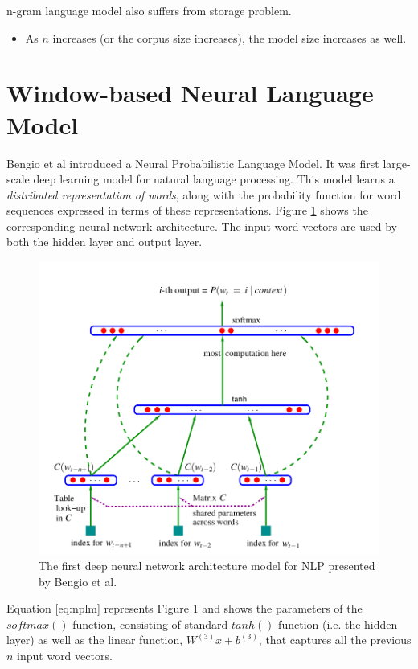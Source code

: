 \documentclass[letterpaper]{article}
\begin{document}
n-gram language model also suffers from storage problem.
\begin{itemize}
	\item As $n$ increases (or the corpus size increases), the model size increases
	as well.
\end{itemize}

\section{Window-based Neural Language Model}
Bengio et al introduced a Neural Probabilistic Language Model. It was
first large-scale deep learning model for natural language processing.
This model learns a \textit{distributed representation of words}, along
with the probability function for word sequences expressed in terms of
these representations. Figure \ref{fig:nplm} shows the corresponding
neural network architecture. The input word vectors are used by both
the hidden layer and output layer.


\begin{figure}[ht]
	\includegraphics[scale=0.3]{images/Neural_Language_Model.png}
	\caption{The first deep neural network architecture model
	for NLP presented by Bengio et al.}
	\label{fig:nplm}
\end{figure}


Equation \ref{eq:nplm} represents Figure \ref{fig:nplm} and shows the
parameters of the $softmax()$ function, consisting of standard $tanh()$
function (i.e. the hidden layer) as well as the linear function, 
$W^{(3)}x + b^{(3)}$, that captures all the previous $n$ input word vectors.
\end{document}
